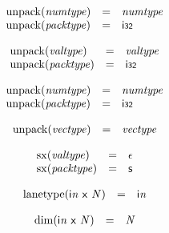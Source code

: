 \vspace{1ex}

$$
\begin{array}{@{}lcl@{}l@{}}
{\mathrm{unpack}}({\mathit{numtype}}) &=& {\mathit{numtype}} &  \\
{\mathrm{unpack}}({\mathit{packtype}}) &=& \mathsf{i{\scriptstyle32}} &  \\
\end{array}
$$

$$
\begin{array}{@{}lcl@{}l@{}}
{\mathrm{unpack}}({\mathit{valtype}}) &=& {\mathit{valtype}} &  \\
{\mathrm{unpack}}({\mathit{packtype}}) &=& \mathsf{i{\scriptstyle32}} &  \\
\end{array}
$$

$$
\begin{array}{@{}lcl@{}l@{}}
{\mathrm{unpack}}({\mathit{numtype}}) &=& {\mathit{numtype}} &  \\
{\mathrm{unpack}}({\mathit{packtype}}) &=& \mathsf{i{\scriptstyle32}} &  \\
\end{array}
$$

$$
\begin{array}{@{}lcl@{}l@{}}
{\mathrm{unpack}}({\mathit{vectype}}) &=& {\mathit{vectype}} &  \\
\end{array}
$$

$$
\begin{array}{@{}lcl@{}l@{}}
{\mathrm{sx}}({\mathit{valtype}}) &=& \epsilon &  \\
{\mathrm{sx}}({\mathit{packtype}}) &=& \mathsf{s} &  \\
\end{array}
$$

\vspace{1ex}

$$
\begin{array}{@{}lcl@{}l@{}}
{\mathrm{lanetype}}({\mathsf{i}}{{\mathit{n}}}~\mathsf{x}~{\mathit{N}}) &=& {\mathsf{i}}{{\mathit{n}}} &  \\
\end{array}
$$

$$
\begin{array}{@{}lcl@{}l@{}}
{\mathrm{dim}}({\mathsf{i}}{{\mathit{n}}}~\mathsf{x}~{\mathit{N}}) &=& {\mathit{N}} &  \\
\end{array}
$$

